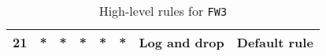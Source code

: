 \documentclass[a4paper, 11pt, oneside]{article}
\begin{document}
\begin{table}[H]
{\begin{tabular}{|llllllll|}
\multicolumn{1}{|l|}{21}          & \multicolumn{1}{l|}{*}                                                            & \multicolumn{1}{l|}{*}                                                              & \multicolumn{1}{l|}{*}                                                                 & \multicolumn{1}{l|}{*}                                                                   & \multicolumn{1}{l|}{*}                 & \multicolumn{1}{l|}{Log and drop}    & Default rule                           \\ \hline
\end{tabular}
}
\caption{High-level rules for \texttt{FW3}}
\end{table}

\end{document}
